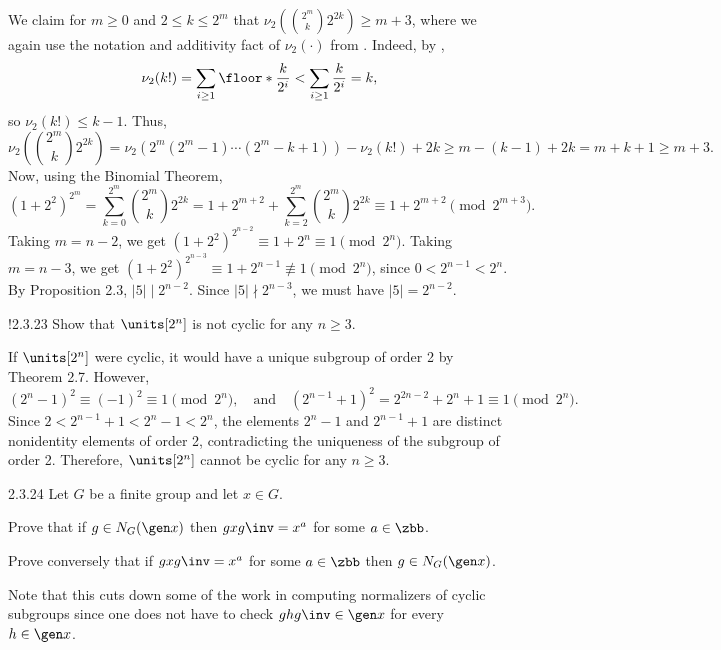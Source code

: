 \begin{sol}
    We claim for $m \geq 0$ and $2 \leq k \leq 2^m$ that $\nu_2(\binom{2^m}{k} 2^{2k}) \geq m + 3$, where we again use the notation and additivity fact of $\nu_2(\cdot)$ from .
    Indeed, by ,
    \[
        \nu_2(k!) = \sum_{i \geq 1} \floor*{\frac{k}{2^i}} < \sum_{i \geq 1} \frac{k}{2^i} = k,
    \]
    so $\nu_2(k!) \leq k - 1$.
    Thus,
    \[
        \nu_2\left(\binom{2^m}{k} 2^{2k}\right)
        = \nu_2(2^m (2^m - 1) \cdots (2^m - k + 1)) - \nu_2(k!) + 2k
        \geq m - (k - 1) + 2k
        = m + k + 1
        \geq m + 3.
    \]
    Now, using the Binomial Theorem,
    \[
        (1 + 2^2)^{2^m} = \sum_{k = 0}^{2^m} \binom{2^m}{k} 2^{2k} = 1 + 2^{m + 2} + \sum_{k = 2}^{2^m} \binom{2^m}{k} 2^{2k} \equiv 1 + 2^{m + 2} \pmod{2^{m + 3}}.
    \]
    Taking $m = n - 2$, we get $(1 + 2^2)^{2^{n - 2}} \equiv 1 + 2^n \equiv 1 \pmod{2^n}$.
    Taking $m = n - 3$, we get $(1 + 2^2)^{2^{n - 3}} \equiv 1 + 2^{n - 1} \not\equiv 1 \pmod{2^n}$, since $0 < 2^{n - 1} < 2^n$.
    By Proposition 2.3, $|5| \mid 2^{n - 2}$.
    Since $|5| \nmid 2^{n - 3}$, we must have $|5| = 2^{n - 2}$.
\end{sol}

\begin{exercise}!{2.3.23}
    Show that $\units[2^n]$ is not cyclic for any $n \geq 3$.
\end{exercise}

\begin{sol}
    If $\units[2^n]$ were cyclic, it would have a unique subgroup of order 2 by Theorem 2.7.
	However,
    \[
    	(2^n - 1)^2 \equiv (-1)^2 \equiv 1 \pmod{2^n}, \quad \text{and} \quad (2^{n - 1} + 1)^2 = 2^{2n - 2} + 2^n + 1 \equiv 1 \pmod{2^n}.
    \]
    Since $2 < 2^{n - 1} + 1 < 2^n - 1 < 2^n$, the elements $2^n - 1$ and $2^{n - 1} + 1$ are distinct nonidentity elements of order 2, contradicting the uniqueness of the subgroup of order 2.
    Therefore, $\units[2^n]$ cannot be cyclic for any $n \geq 3$.
\end{sol}

\begin{exercise}{2.3.24}
    Let $G$ be a finite group and let $x \in G$.
    \begin{subexercises}
        \item Prove that if $g \in N_G(\gen x)$ then $gxg\inv = x^a$ for some $a \in \zbb$.
        \item Prove conversely that if $gxg\inv = x^a$ for some $a \in \zbb$ then $g \in N_G(\gen x)$.
    \end{subexercises}
    Note that this cuts down some of the work in computing normalizers of cyclic subgroups since one does not have to check $ghg\inv \in \gen x$ for every $h \in \gen x$.
\end{exercise}


